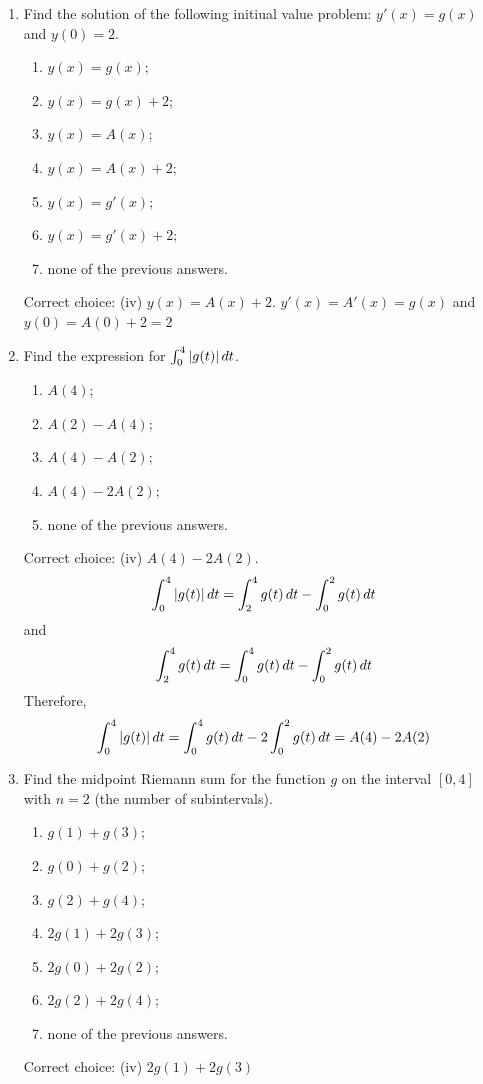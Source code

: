 \documentclass[nooutcomes,handout]{ximera}
\begin{document}
\begin{problem}
\begin{enumerate}
    \item
      Find the solution of the following initiual value problem: $y'(x) = g(x)$ and $y(0) = 2$.
      \begin{enumerate}
        \item $y(x) = g(x)$;
        \item $y(x) = g(x) + 2$;
        \item $y(x) = A(x)$;
        \item $y(x) = A(x) + 2$;
        \item $y(x) = g'(x)$;
        \item $y(x) = g'(x) + 2$;
        \item none of the previous answers.
      \end{enumerate}
      \begin{freeResponse}
        Correct choice: (iv) $y(x) = A(x) + 2$.  $y'(x)=A'(x)=g(x)$ and $y(0)=A(0)+2=2$
      \end{freeResponse}

    \item
      Find the expression for $\int_0^4 |g(t)| \,d t$.
      \begin{enumerate}
        \item $A(4)$;
        \item $A(2) - A(4)$;
        \item $A(4) - A(2)$;
        \item $A(4) - 2 A(2)$;
        \item none of the previous answers.
      \end{enumerate}
      \begin{freeResponse}
        Correct choice: (iv) $A(4) - 2 A(2)$.  \\
        $$\int_0^4 |g(t)| \,d t = \int_2^4 g(t) \,d t-\int_0^2 g(t) \,d t  $$
       and  $$\int_2^4 g(t) \,d t =\int_0^4 g(t) \,d t-\int_0^2 g(t) \,d t $$
       Therefore, $$\int_0^4 |g(t)| \,d t = \int_0^4 g(t) \,d t-2\int_0^2 g(t) \,d t =A(4)-2A(2) $$
      \end{freeResponse}

    \item
      Find the midpoint Riemann sum for the function $g$ on the interval $[0, 4]$ with $n = 2$ (the number of subintervals).
      \begin{enumerate}
        \item $g(1) + g(3)$;
        \item $g(0) + g(2)$;
        \item $g(2) + g(4)$;
        \item $2g(1) + 2g(3)$;
        \item $2g(0) + 2g(2)$;
        \item $2g(2) + 2g(4)$;
        \item none of the previous answers.
      \end{enumerate}
      \begin{freeResponse}
        Correct choice: (iv) $2g(1) + 2g(3)$
        

\end{freeResponse}
\end{enumerate}
\end{problem}
\end{document}
